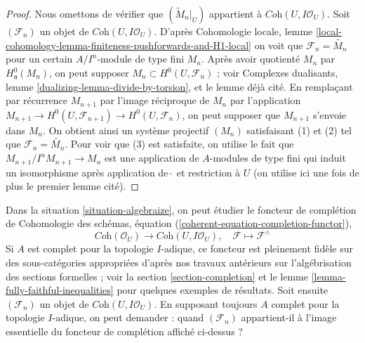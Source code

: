 \begin{proof}
Nous omettons de vérifier que $(\widetilde{M}_n|_U)$ appartient à
$\textit{Coh}(U, I\mathcal{O}_U)$. Soit $(\mathcal{F}_n)$
un objet de $\textit{Coh}(U, I\mathcal{O}_U)$.
D'après Cohomologie locale, lemme
\ref{local-cohomology-lemma-finiteness-pushforwards-and-H1-local}
on voit que $\mathcal{F}_n = \widetilde{M_n}$ pour un certain
$A/I^n$-module de type fini $M_n$. Après avoir quotienté $M_n$ par $H^0_\mathfrak a(M_n)$,
on peut supposer $M_n \subset H^0(U, \mathcal{F}_n)$ ; voir
Complexes dualisants, lemme \ref{dualizing-lemma-divide-by-torsion},
et le lemme déjà cité.
En remplaçant par récurrence $M_{n + 1}$ par l'image réciproque
de $M_n$ par l'application $M_{n + 1} \to H^0(U, \mathcal{F}_{n + 1})
\to H^0(U, \mathcal{F}_n)$, on peut supposer que $M_{n + 1}$ s'envoie dans
$M_n$. On obtient ainsi un système projectif $(M_n)$ satisfaisant (1) et (2)
tel que $\mathcal{F}_n = \widetilde{M_n}$. Pour voir que (3)
est satisfaite, on utilise le fait que $M_{n + 1}/I^nM_{n + 1} \to M_n$ est une application
de $A$-modules de type fini qui induit un isomorphisme après
application de $\widetilde{\ }$ et restriction à $U$
(on utilise ici une fois de plus le premier lemme cité).
\end{proof}

\noindent
Dans la situation \ref{situation-algebraize}, on peut étudier le foncteur de complétion de
Cohomologie des schémas, équation (\ref{coherent-equation-completion-functor}),
\begin{equation}
\label{equation-completion}
\textit{Coh}(\mathcal{O}_U)
\longrightarrow
\textit{Coh}(U, I\mathcal{O}_U),\quad
\mathcal{F} \longmapsto \mathcal{F}^\wedge
\end{equation}
Si $A$ est complet pour la topologie $I$-adique, ce foncteur est pleinement fidèle
sur des sous-catégories appropriées d'après nos travaux antérieurs sur l'algébrisation des
sections formelles ; voir la section \ref{section-completion} et le
lemme \ref{lemma-fully-faithful-inequalities} pour quelques exemples de résultats.
Soit ensuite $(\mathcal{F}_n)$ un objet de $\textit{Coh}(U, I\mathcal{O}_U)$.
En supposant toujours $A$ complet pour la topologie $I$-adique, on peut demander :
quand $(\mathcal{F}_n)$ appartient-il à l'image essentielle du foncteur de complétion
affiché ci-dessus ?

